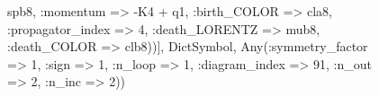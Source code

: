 \documentclass{revtex4}
\begin{document}
\begin{figure}[!htb]
\begin{center}
{spb8, :momentum => -K4 + q1, :birth_COLOR => cla8, :propagator_index => 4, :death_LORENTZ => mub8, :death_COLOR => clb8))], Dict{Symbol, Any}(:symmetry_factor => 1, :sign => 1, :n_loop => 1, :diagram_index => 91, :n_out => 2, :n_inc => 2)) 
}
\end{center}
\end{figure}
\end{document}
